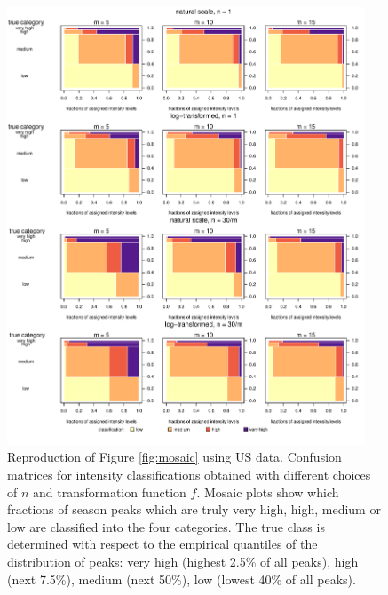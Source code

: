 \documentclass[12pt]{article}
\begin{document}
\begin{figure}
\includegraphics[width=0.95\textwidth]{figure/mosaic_us.pdf}
\caption{Reproduction of Figure \ref{fig:mosaic} using US data. Confusion matrices for intensity classifications obtained with different choices of $n$ and transformation function $f$. Mosaic plots show which fractions of season peaks which are truly very high, high, medium or low are classified into the four categories. The true class is determined with respect to the empirical quantiles of the distribution of peaks: very high (highest 2.5\% of all peaks), high (next 7.5\%), medium (next 50\%), low (lowest 40\% of all peaks).}
\label{fig:mosaic_us}
\end{figure}

\newpage
\end{document}

